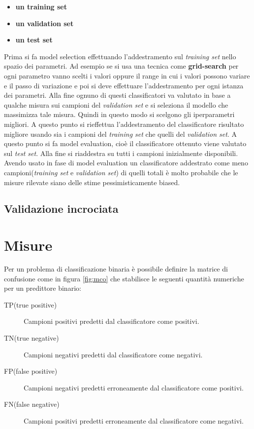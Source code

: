 \begin{itemize}
\item \textbf{un training set}
\item \textbf{un validation set}
\item \textbf{un test set}
\end{itemize} 
Prima si fa model selection effettuando l'addestramento sul \textit{training set} nello spazio dei parametri. Ad esempio se si usa una tecnica come \textbf{grid-search} per ogni parametro vanno scelti i valori oppure il range in cui i valori possono variare e il passo di variazione e poi si deve effettuare l'addestramento per ogni istanza dei parametri. Alla fine ognuno di questi classificatori va valutato in base a qualche misura sui campioni del \textit{validation set} e si seleziona il modello che massimizza tale misura. Quindi in questo modo si scelgono gli iperparametri migliori. A questo punto si rieffettua l'addestramento del classificatore risultato migliore usando sia i campioni del \textit{training set} che quelli del \textit{validation set}. A questo punto si fa model evaluation, cioè il classificatore ottenuto viene valutato sul \textit{test set}. Alla fine si riaddestra su tutti i campioni inizialmente disponibili. Avendo usato in fase di model evaluation un classificatore addestrato come meno campioni(\textit{training set} e \textit{validation set}) di quelli totali è molto probabile che le misure rilevate siano delle stime pessimisticamente biased. 

\subsection{Validazione incrociata}


\section{Misure}
\label{sub:measure}
Per un problema di classificazione binaria è possibile definire la matrice di confusione come in figura \ref{fig:mco} che stabilisce le seguenti quantità numeriche per un predittore binario:
\begin{description}
\item[TP(true positive)] Campioni positivi predetti dal classificatore come positivi.
\item[TN(true negative)] Campioni negativi predetti dal classificatore come negativi.
\item[FP(false positive)] Campioni negativi predetti erroneamente dal classificatore come positivi.
\item[FN(false negative)] Campioni positivi predetti erroneamente dal classificatore come negativi.
\end{description}

